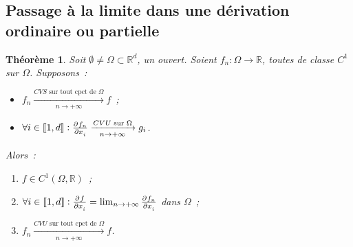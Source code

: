 \documentclass{report}
\newtheorem{thm}{Théorème}[chapter]
\theoremstyle{definition}
\theoremstyle{remark}
\numberwithin{equation}{section}
\newcommand{\R}{\mathbb R}
\newcommand{\CONV}[5]{\xrightarrow[#2 \to #3]{#4 \text{ #5 } #1}}
\newcommand{\CVSc}[3]{\CONV{#1}{#2}{#3}{CVS}{sur tout cpct de}}
\newcommand{\CVU}[3]{\CONV{#1}{#2}{#3}{CVU}{sur}}
\newcommand{\CVUc}[3]{\CONV{#1}{#2}{#3}{CVU}{sur tout cpct de}}
\newcommand{\intint}[2]{\left\llbracket#1, #2\right\rrbracket}
\newcommand{\pinfty}{{+\infty}}
\begin{document}
		\subsection{Passage à la limite dans une dérivation ordinaire ou partielle}
			\begin{thm} Soit $\emptyset \neq \Omega \subset \R^d$, un ouvert. Soient $f_n : \Omega \to \R$, toutes de classe $C^1$ sur $\Omega$. Supposons~:
			\begin{itemize}
				\item $f_n \CVSc \Omega n\pinfty f$~;
				\item $\forall i \in \intint 1d : \pd {f_n}{x_i} \CVU \Omega n\pinfty g_i$.
			\end{itemize}

			Alors~:
			\begin{enumerate}
				\item $f \in C^1(\Omega, \R)$~;
				\item $\forall i \in \intint 1d : \pd f{x_i} = \lim_{n \to \pinfty} \pd {f_n}{x_i}$ dans $\Omega$~;
				\item $f_n \CVUc \Omega n\pinfty f$.
			\end{enumerate}
			\end{thm}
\end{document}
